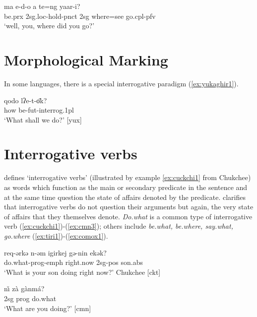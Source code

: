 \documentclass [11pt, proquest] {uwthesis}[2016/11/22]
\begin{document}
\begin{exe}
\ex \gll ma e-d-o a te=ng yaar-i?\\
be.{\sc prx} {\sc 2sg.loc}-hold-{\sc pnct} {\sc 2sg} where=see go.{\sc cpl-pfv}\\
`well, you, where did you go?'
\label{ex:abz1}
\end{exe}


\section{Morphological Marking}
In some languages, there is a special interrogative paradigm (\ref{ex:yukaghir1}).

\begin{exe}
\ex \gll qodo lʔe-t-о̄k?\\
how be-{\sc fut-interrog.1pl}\\
`What shall we do?' [yux] \citep[][p. 9]{hagege2008towards}
\label{ex:yukaghir1}
\end{exe}


\section{Interrogative verbs}
\label{sec:wh-verbs}
\citet{hagege2008towards} defines `interrogative verbs' (illustrated by example \ref{ex:cuckchi1} from Chukchee) as words which function as the main or secondary predicate in the sentence and at the same time question the state of affairs denoted by the predicate. \citet{hagege2008towards} clarifies that interrogative verbs do not question their arguments but again, the very state of affairs that they themselves denote.
{\it Do.what} is a common type of interrogative verb (\ref{ex:cuckchi1})-(\ref{ex:cmn3}); others include {\it be.what, be.where, say.what, go.where} (\ref{ex:tiri1})-(\ref{ex:comox1}).


\begin{exe}
\ex \gll req-ərkə n-əm igirkej gə-nin ekək?\\
do.what-{\sc prog-emph} right.now {\sc 2sg-pos} son.{\sc abs}\\
`What is your son doing right now?' Chukchee [ckt] \cite[p. 1147]{mackenzie2009content}
\label{ex:cuckchi1}
\end{exe}

 \begin{exe}
 \ex \gll n\v{\i} z\`{a} g\`{a}nm\'{a}?\\
 {\sc 2sg} {\sc prog} do.what\\
 `What are you doing?' [cmn] \cite[p. 2]{hagege2008towards}
 \label{ex:cmn3}
 \end{exe}
\end{document}
